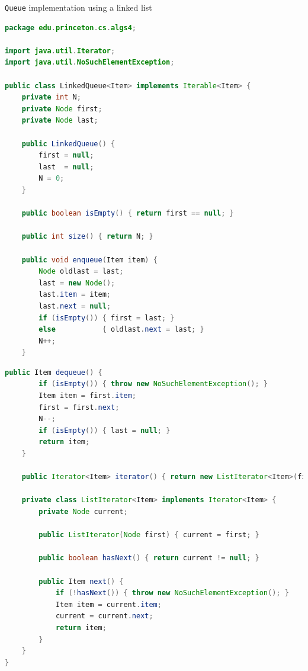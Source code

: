 \documentclass[8pt,a4paper,compress]{beamer}
\begin{document}
\begin{frame}[fragile]
\pause

\lstinline{Queue} implementation using a linked list
\begin{lstlisting}[language=Java]
package edu.princeton.cs.algs4;

import java.util.Iterator;
import java.util.NoSuchElementException;

public class LinkedQueue<Item> implements Iterable<Item> {
    private int N; 
    private Node first; 
    private Node last; 

    public LinkedQueue() {
        first = null;
        last  = null;
        N = 0;
    }

    public boolean isEmpty() { return first == null; }

    public int size() { return N; }

    public void enqueue(Item item) {
        Node oldlast = last;
        last = new Node();
        last.item = item;
        last.next = null;
        if (isEmpty()) { first = last; }
        else           { oldlast.next = last; }
        N++;
    }
\end{lstlisting}
\end{frame}

\begin{frame}[fragile]
\pause

\begin{lstlisting}[language=Java]
    public Item dequeue() {
        if (isEmpty()) { throw new NoSuchElementException(); }
        Item item = first.item;
        first = first.next;
        N--;
        if (isEmpty()) { last = null; }
        return item;
    }

    public Iterator<Item> iterator() { return new ListIterator<Item>(first); }

    private class ListIterator<Item> implements Iterator<Item> {
        private Node current;

        public ListIterator(Node first) { current = first; }

        public boolean hasNext() { return current != null; }

        public Item next() {
            if (!hasNext()) { throw new NoSuchElementException(); }
            Item item = current.item;
            current = current.next; 
            return item;
        }
    }
}
\end{lstlisting}
\end{frame}
\end{document}
